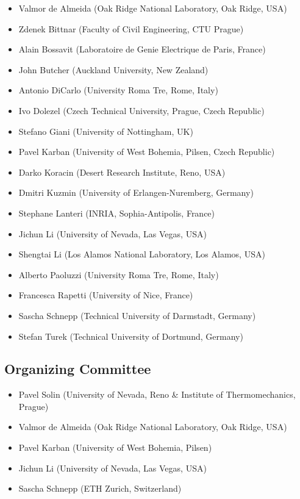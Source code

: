 \documentclass[article,A4,11pt]{llncs}%
\begin{document}
\begin{itemize}
\item Valmor de Almeida (Oak Ridge National Laboratory, Oak Ridge, USA)
\item Zdenek Bittnar (Faculty of Civil Engineering, CTU Prague)
\item Alain Bossavit (Laboratoire de Genie Electrique de Paris, France)
\item John Butcher (Auckland University, New Zealand)
\item Antonio DiCarlo (University Roma Tre, Rome, Italy)
\item Ivo Dolezel (Czech Technical University, Prague, Czech Republic)
\item Stefano Giani (University of Nottingham, UK)
\item Pavel Karban (University of West Bohemia, Pilsen, Czech Republic)
\item Darko Koracin (Desert Research Institute, Reno, USA)
\item Dmitri Kuzmin (University of Erlangen-Nuremberg, Germany)
\item Stephane Lanteri (INRIA, Sophia-Antipolis, France)
\item Jichun Li (University of Nevada, Las Vegas, USA)
\item Shengtai Li (Los Alamos National Laboratory, Los Alamos, USA)
\item Alberto Paoluzzi (University Roma Tre, Rome, Italy)
\item Francesca Rapetti (University of Nice, France)
\item Sascha Schnepp (Technical University of Darmstadt, Germany)
\item Stefan Turek (Technical University of Dortmund, Germany)
\end{itemize}

\subsection*{Organizing Committee}

\begin{itemize}
\item Pavel Solin (University of Nevada, Reno \& Institute of Thermomechanics, Prague)
\item Valmor de Almeida (Oak Ridge National Laboratory, Oak Ridge, USA)
\item Pavel Karban (University of West Bohemia, Pilsen)
\item Jichun Li (University of Nevada, Las Vegas, USA)
\item Sascha Schnepp (ETH Zurich, Switzerland)

\end{itemize}
\end{document}
